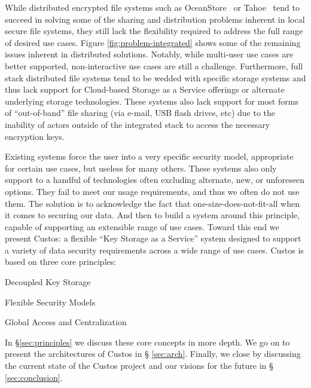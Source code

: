 While distributed encrypted file systems such as
OceanStore~\cite{Kubiatowicz2000} or Tahoe~\cite{Wilcox-O'Hearn2008}
tend to succeed in solving some of the sharing and distribution
problems inherent in local secure file systems, they still lack the
flexibility required to address the full range of desired use
cases. Figure \ref{fig:problem-integrated} shows some of the remaining
issues inherent in distributed solutions. Notably, while multi-user
use cases are better supported, non-interactive use cases are still a
challenge. Furthermore, full stack distributed file systems tend to be
wedded with specific storage systems and thus lack support for
Cloud-based Storage as a Service offerings or alternate underlying
storage technologies. These systems also lack support for most forms
of ``out-of-band'' file sharing (via e-mail, USB flash drives, etc)
due to the inability of actors outside of the integrated stack to
access the necessary encryption keys.

Existing systems force the user into a very specific security model,
appropriate for certain use cases, but useless for many others. These
systems also only support to a handful of technologies often excluding
alternate, new, or unforeseen options. They fail to meet our usage
requirements, and thus we often do not use them. The solution is to
acknowledge the fact that one-size-does-not-fit-all when it comes to
securing our data. And then to build a system around this principle,
capable of supporting an extensible range of use cases. Toward this
end we present Custos: a flexible ``Key Storage as a Service'' system
designed to support a variety of data security requirements across a
wide range of use cases. Custos is based on three core principles:

\begin{packed_item}
\item Decoupled Key Storage
\item Flexible Security Models
\item Global Access and Centralization
\end{packed_item}

In \S \ref{sec:principles} we discuss these core concepts in more
depth. We go on to present the architectures of Custos in \S
\ref{sec:arch}. Finally, we close by discussing the current state of
the Custos project and our visions for the future in \S
\ref{sec:conclusion}.

